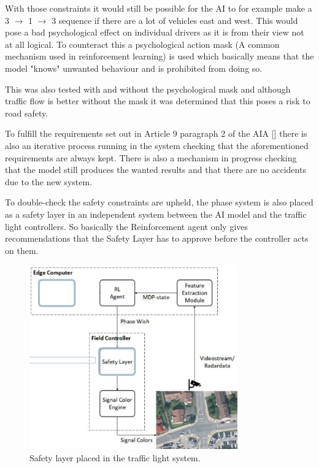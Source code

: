 With those constraints it would still be possible for the AI to for example make a 3 $\rightarrow$ 1 $\rightarrow$ 3 sequence if there are a lot of vehicles east and west. This would pose a bad psychological effect on individual drivers as it is from their view not at all logical. To counteract this a psychological action mask (A common mechanism used in reinforcement learning) is used which basically means that the model "knows" unwanted behaviour and is prohibited from doing so.

This was also tested with and without the psychological mask and although traffic flow is better without the mask it was determined that this poses a risk to road safety.

To fulfill the requirements set out in Article 9 paragraph 2 of the AIA [\citet{ai_act}] there is also an iterative process running in the system checking that the aforementioned requirements are always kept. There is also a mechanism in progress checking that the model still produces the wanted results and that there are no accidents due to the new system.

To double-check the safety constraints are upheld, the phase system is also placed as a safety layer in an independent system between the AI model and the traffic light controllers. So basically the Reinforcement agent only gives recommendations that the Safety Layer has to approve before the controller acts on them.

\begin{figure}[h]
        \centering
        \includegraphics[width=0.8\textwidth]{paper-template/figs/risk_management_1.PNG}
        \caption{Safety layer placed in the traffic light system.}
        \label{fig:my_label}
    \end{figure}
    
